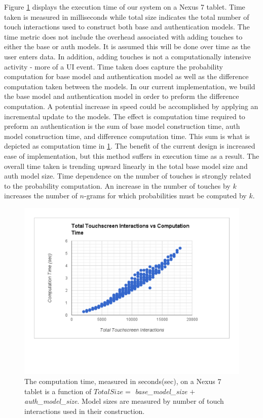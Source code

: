 \documentclass{acm_proc_article-sp}
\begin{document}
Figure \ref{fig:nexus_total_size_time} displays
the execution time of our system on a Nexus 7 tablet.
Time taken is measured in milliseconds while 
total size indicates the total number of touch interactions used 
to construct both base and authentication models. 
%
The time metric does not include the overhead associated with adding touches to either the base or auth models. 
It is assumed this will be done over time as the user enters data.
In addition, adding touches is not a computationally intensive activity - more of a UI event. 
Time taken does capture 
the probability computation 
for base model and authentication model 
as well as the difference computation taken between the models.
%
In our current implementation,
we build the base model and authentication model in order to preform
the difference computation.
A potential increase in speed could be accomplished
by applying an incremental update to the models.
%
The effect is computation time required to preform an authentication is the sum of
base model construction time, 
auth model construction time, and
difference computation time.
This sum is what is depicted as computation time in \ref{fig:nexus_total_size_time}.
%
The benefit of the current design is increased ease of implementation, 
but this method suffers in execution time as a result.
%
The overall time taken is trending upward linearly in the total base model size and auth model size.
Time dependence on the number of touches is strongly related to
the probability computation.
An increase in the number of touches by $k$
increases the number of $n$-grams 
for which probabilities must be computed 
by $k$.

\begin{figure}
\centering
\includegraphics[width=.45\textwidth]{nexus_7_runtimes.pdf}
\caption{
The computation time, measured in seconds(sec), on a Nexus 7 tablet is
a function of
$Total Size =$ {\it base\_model\_size} $+$ {\it auth\_model\_size}.
Model sizes are measured by number of touch interactions used in their construction.
}
\label{fig:nexus_total_size_time}
\end{figure}
\end{document}
